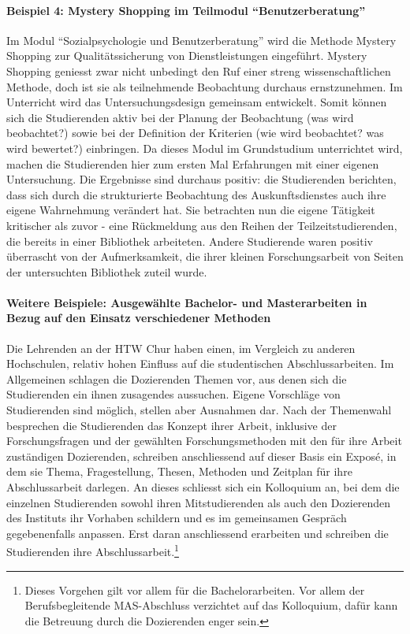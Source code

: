\documentclass[a4paper,
fontsize=11pt,
oneside,
numbers=noperiodatend,
parskip=half-,
bibliography=totoc,
final
]{scrartcl}
\begin{document}
\paragraph{Beispiel 4: Mystery Shopping im Teilmodul
\enquote{Benutzerberatung}}\label{beispiel-4-mystery-shopping-im-teilmodul-benutzerberatung}

Im Modul \enquote{Sozialpsychologie und Benutzerberatung} wird die
Methode Mystery Shopping zur Qualitätssicherung von Dienstleistungen
eingeführt. Mystery Shopping geniesst zwar nicht unbedingt den Ruf einer
streng wissenschaftlichen Methode, doch ist sie als teilnehmende
Beobachtung durchaus ernstzunehmen. Im Unterricht wird das
Untersuchungsdesign gemeinsam entwickelt. Somit können sich die
Studierenden aktiv bei der Planung der Beobachtung (was wird
beobachtet?) sowie bei der Definition der Kriterien (wie wird
beobachtet? was wird bewertet?) einbringen. Da dieses Modul im
Grundstudium unterrichtet wird, machen die Studierenden hier zum ersten
Mal Erfahrungen mit einer eigenen Untersuchung. Die Ergebnisse sind
durchaus positiv: die Studierenden berichten, dass sich durch die
strukturierte Beobachtung des Auskunftsdienstes auch ihre eigene
Wahrnehmung verändert hat. Sie betrachten nun die eigene Tätigkeit
kritischer als zuvor - eine Rückmeldung aus den Reihen der
Teilzeitstudierenden, die bereits in einer Bibliothek arbeiteten. Andere
Studierende waren positiv überrascht von der Aufmerksamkeit, die ihrer
kleinen Forschungsarbeit von Seiten der untersuchten Bibliothek zuteil
wurde.

\paragraph{Weitere Beispiele: Ausgewählte Bachelor- und Masterarbeiten
in Bezug auf den Einsatz verschiedener
Methoden}\label{weitere-beispiele-ausgewuxe4hlte-bachelor--und-masterarbeiten-in-bezug-auf-den-einsatz-verschiedener-methoden}

Die Lehrenden an der HTW Chur haben einen, im Vergleich zu anderen
Hochschulen, relativ hohen Einfluss auf die studentischen
Abschlussarbeiten. Im Allgemeinen schlagen die Dozierenden Themen vor,
aus denen sich die Studierenden ein ihnen zusagendes aussuchen. Eigene
Vorschläge von Studierenden sind möglich, stellen aber Ausnahmen dar.
Nach der Themenwahl besprechen die Studierenden das Konzept ihrer
Arbeit, inklusive der Forschungsfragen und der gewählten
Forschungsmethoden mit den für ihre Arbeit zuständigen Dozierenden,
schreiben anschliessend auf dieser Basis ein Exposé, in dem sie Thema,
Fragestellung, Thesen, Methoden und Zeitplan für ihre Abschlussarbeit
darlegen. An dieses schliesst sich ein Kolloquium an, bei dem die
einzelnen Studierenden sowohl ihren Mitstudierenden als auch den
Dozierenden des Instituts ihr Vorhaben schildern und es im gemeinsamen
Gespräch gegebenenfalls anpassen. Erst daran anschliessend erarbeiten
und schreiben die Studierenden ihre Abschlussarbeit.\footnote{Dieses
  Vorgehen gilt vor allem für die Bachelorarbeiten. Vor allem der
  Berufsbegleitende MAS-Abschluss verzichtet auf das Kolloquium, dafür
  kann die Betreuung durch die Dozierenden enger sein.}
\end{document}
